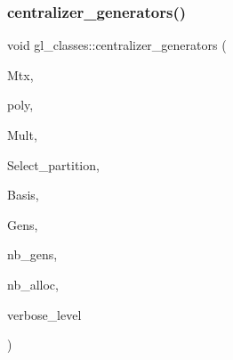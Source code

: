 \subsubsection{\texorpdfstring{centralizer\+\_\+generators()}{centralizer\_generators()}}
{\footnotesize\ttfamily void gl\+\_\+classes\+::centralizer\+\_\+generators (\begin{DoxyParamCaption}\item[{\mbox{\hyperlink{galois_8h_a09fddde158a3a20bd2dcadb609de11dc}{I\+NT}} $\ast$}]{Mtx,  }\item[{\mbox{\hyperlink{galois_8h_a77ca58de3d2da6172242493dd9c8aaa8}{unipoly\+\_\+object}} \&}]{poly,  }\item[{\mbox{\hyperlink{galois_8h_a09fddde158a3a20bd2dcadb609de11dc}{I\+NT}} $\ast$}]{Mult,  }\item[{\mbox{\hyperlink{galois_8h_a09fddde158a3a20bd2dcadb609de11dc}{I\+NT}} $\ast$}]{Select\+\_\+partition,  }\item[{\mbox{\hyperlink{galois_8h_a09fddde158a3a20bd2dcadb609de11dc}{I\+NT}} $\ast$}]{Basis,  }\item[{\mbox{\hyperlink{galois_8h_a09fddde158a3a20bd2dcadb609de11dc}{I\+NT}} $\ast$$\ast$\&}]{Gens,  }\item[{\mbox{\hyperlink{galois_8h_a09fddde158a3a20bd2dcadb609de11dc}{I\+NT}} \&}]{nb\+\_\+gens,  }\item[{\mbox{\hyperlink{galois_8h_a09fddde158a3a20bd2dcadb609de11dc}{I\+NT}} \&}]{nb\+\_\+alloc,  }\item[{\mbox{\hyperlink{galois_8h_a09fddde158a3a20bd2dcadb609de11dc}{I\+NT}}}]{verbose\+\_\+level }\end{DoxyParamCaption})}

\mbox{\label{classgl__classes_a28bbe0c59d7f397284d625e61016a687}} 
